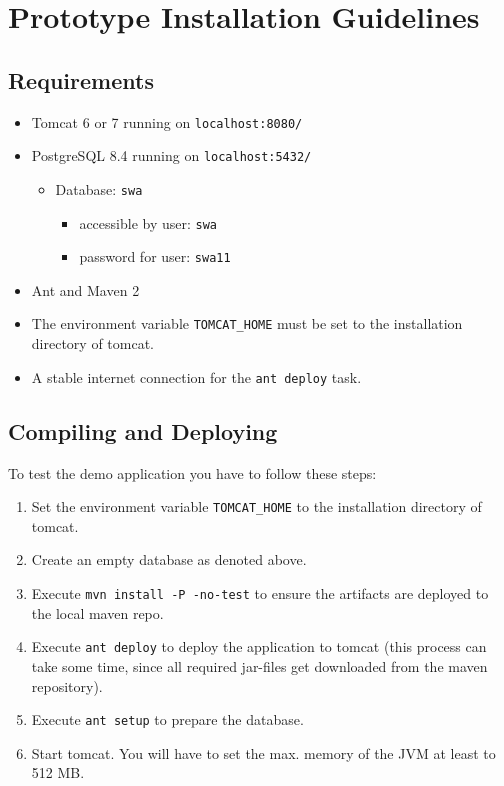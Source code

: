 \documentclass[11pt]{article}
\begin{document}
\newpage

\section{Prototype Installation Guidelines}

\subsection{Requirements}

\begin{itemize}
\item Tomcat 6 or 7 running on \texttt{localhost:8080/}
\item PostgreSQL 8.4 running on \texttt{localhost:5432/}
	\begin{itemize}
	\item Database: \texttt{swa}
		\begin{itemize}
		\item accessible by user: \texttt{swa}
		\item password for user: \texttt{swa11}
		\end{itemize}
	\end{itemize}
\item Ant and Maven 2
\item The environment variable \texttt{TOMCAT\_HOME} must be set to the installation directory of tomcat.
\item A stable internet connection for the \texttt{ant deploy} task.
\end{itemize}

\subsection{Compiling and Deploying}

To test the demo application you have to follow these steps:

\begin{enumerate}
\item Set the environment variable \texttt{TOMCAT\_HOME} to the installation directory of tomcat.
\item Create an empty database as denoted above.
\item Execute \texttt{mvn install -P -no-test} to ensure the artifacts are deployed to the local maven repo.
\item Execute \texttt{ant deploy} to deploy the application to tomcat (this process can take some time, since all required jar-files get downloaded from the maven repository).
\item Execute \texttt{ant setup} to prepare the database.
\item Start tomcat. You will have to set the max. memory of the JVM at least to 512 MB.
\end{enumerate}
\end{document}
